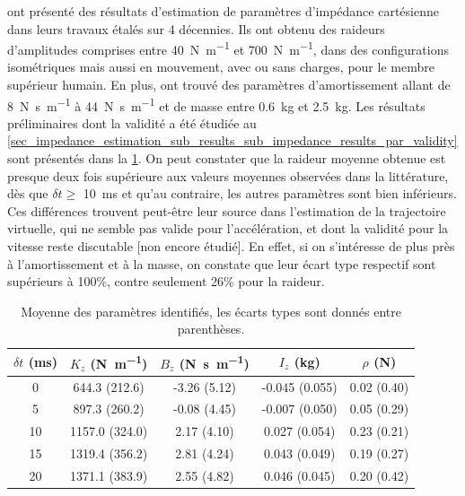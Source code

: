 \documentclass[12pt, a4paper]{article} %
\numberwithin{equation}{section}
\begin{document}
\cite{mussa-ivaldi_neural_1985, dolan_dynamic_1993, tsuji_bio-mimetic_2008, erden_end-point_2015} ont présenté des résultats d'estimation de paramètres d'impédance cartésienne dans leurs travaux étalés sur 4 décennies. Ils ont obtenu des raideurs d'amplitudes comprises entre \SI{40}{\newton\per\metre} et \SI{700}{\newton\per\metre}, dans des configurations isométriques mais aussi en mouvement, avec ou sans charges, pour le membre supérieur humain. En plus, \cite{dolan_dynamic_1993, tsuji_bio-mimetic_2008, erden_end-point_2015} ont trouvé des paramètres d'amortissement allant de \SI{8}{\newton\second\per\metre} à \SI{44}{\newton\second\per\metre} et de masse entre \SI{0.6}{\kilogram} et \SI{2.5}{\kilogram}.
%
\newlineBlank
% 
Les résultats préliminaires dont la validité a été étudiée au \cref{sec_impedance_estimation_sub_results_sub_impedance_results_par_validity} sont présentés dans la \cref{tab_param_identification}. On peut constater que la raideur moyenne obtenue est presque deux fois supérieure aux valeurs moyennes observées dans la littérature, dès que $ \delta t \geq $ \SI{10}{\milli\second} et qu'au contraire, les autres paramètres sont bien inférieurs. Ces différences trouvent peut-être leur source dans l'estimation de la trajectoire virtuelle, qui ne semble pas valide pour l'accélération, et dont la validité pour la vitesse reste discutable [non encore étudié]. En effet, si on s'intéresse de plus près à l'amortissement et à la masse, on constate que leur écart type respectif sont supérieurs à 100\%, contre seulement 26\% pour la raideur.
%
\begin{table}[htbp] 
	\begin{center}
		\begingroup
		\setlength{\tabcolsep}{10pt} %
		\renewcommand{\arraystretch}{1.5} %
		\begin{tabular}{c|c c c c}
			$ \delta t $ (\si{\milli\second}) & $ K_z $ (\si{\newton\per\metre}) & $ B_z $ (\si{\newton\second\per\metre}) & $ I_z $ (\si{\kilogram}) &  $ \rho $ (\si{\newton})\\
			\hline
			0 & 644.3 (212.6) & -3.26 (5.12) & -0.045 (0.055) & 0.02 (0.40) \\
			5 & 897.3 (260.2) & -0.08 (4.45) & -0.007 (0.050) & 0.05 (0.29) \\
			10 & 1157.0 (324.0) & 2.17 (4.10) & 0.027 (0.054) & 0.23 (0.21)\\
			15 & 1319.4 (356.2) & 2.81 (4.24) & 0.043 (0.049) & 0.19 (0.27) \\
			20 & 1371.1 (383.9) & 2.55 (4.82) & 0.046 (0.045) & 0.20 (0.42) \\ 
		\end{tabular}
	\endgroup
	\end{center}
	\caption{Moyenne des paramètres identifiés, les écarts types sont donnés entre parenthèses.} 
	\label{tab_param_identification}	
\end{table}
%
\end{document}
